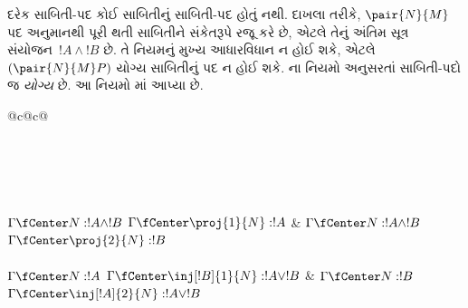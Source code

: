 દરેક સાબિતી-પદ કોઈ સાબિતીનું
સાબિતી-પદ હોતું નથી. દાખલા તરીકે,
$\pair{N}{M}$ પદ \Intro{\land}
અનુમાનથી પૂરી થતી સાબિતીને સંકેતરૂપે
રજૂ કરે છે, એટલે તેનું અંતિમ સૂત્ર
સંયોજન~$!A \land !B$ છે. તે
\Elim{\lif} નિયમનું મુખ્ય આધારવિધાન
ન હોઈ શકે, એટલે $(\pair{N}{M}P)$
યોગ્ય સાબિતીનું પદ ન હોઈ શકે.
ના નિયમો અનુસરતાં
સાબિતી-પદો જ \emph{યોગ્ય} છે.
આ નિયમો માં આપ્યા છે.

\begingroup
\makeatletter{}\makeatother

\label{guunit:OLP-0692}


\begin{table}
\begin{tabular}{@{}c@{}c@{}}
\\
\\[3ex]
\\[3ex]
\\[4ex]
\\[4ex]
\\[4ex]
\Axiom$\Gamma \fCenter N: !A \land !B$
\RightLabel{\Elim{\land}[1]}
\UnaryInf$\Gamma \fCenter \proj{1}{N} : !A$
\DisplayProof
&
\Axiom$\Gamma \fCenter N:!A \land !B$
\RightLabel{\Elim{\land}[2]}
\UnaryInf$\Gamma \fCenter \proj{2}{N} : !B$
\DisplayProof\\[3ex]
\\[4ex]
\Axiom$\Gamma \fCenter N: !A$
\RightLabel{\Intro{\lor}[1]}
\UnaryInf$\Gamma \fCenter \inj[!B]{1}{N} : !A \lor !B$
\DisplayProof
&
\Axiom$ \Gamma \fCenter N : !B$
\RightLabel{\Intro{\lor}[2]}
\UnaryInf$\Gamma \fCenter \inj[!A]{2}{N} : !A \lor !B$
\DisplayProof\\[3ex]
\\[4ex]
\end{tabular}
\caption{પદથી ચિહ્નિત અંતઃપ્રજ્ઞાવાદી વિધાનતર્કીય
સ્વાભાવિક નિગમન તંત્ર ના નિયમો.}
\end{table}
\endgroup
\endgroup

